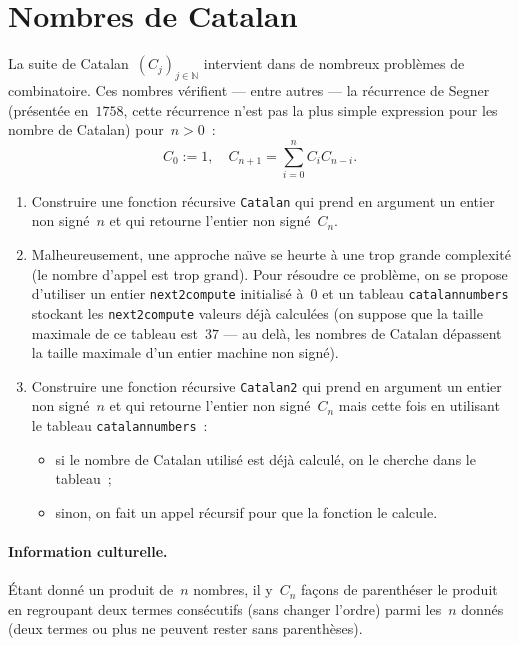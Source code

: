 \section{Nombres de Catalan}
\label{sec:NombresCatalan}
La suite   de Catalan~$(C_{j})_{j\in\mathbb{N}}$ intervient   dans  de
nombreux probl\`emes de combinatoire.  
Ces nombres v\'erifient --- entre autres --- la r\'ecurrence de Segner
(pr\'esent\'ee en~$1758$,    cette  r\'ecurrence  n'est  pas  la  plus
simple expression pour les nombre de Catalan) pour~${n>0}$~:
\[
C_{0}:= 1, \quad C_{n+1}= \sum_{i=0}^{n} C_{i}C_{n-i}.
\]
\begin{enumerate}
\item Construire   une  fonction r\'ecursive \texttt{Catalan} qui prend  en   argument  un entier  non
sign\'e~$n$ et qui retourne l'entier non sign\'e~$C_{n}$.
\ifcorrection
\begin{correction}
  \par

\end{correction}
\fi
\item[] Malheureusement, une approche na\"\i{}ve se heurte \`a une
  trop grande complexit\'e (le nombre d'appel est trop grand). Pour
  r\'esoudre ce probl\`eme, on se propose d'utiliser un entier
  \texttt{next2compute} initialis\'e \`a~$0$ et un tableau \texttt{catalannumbers}
  stockant les \texttt{next2compute} valeurs d\'ej\`a calcul\'ees (on
  suppose que la taille maximale de ce tableau est~$37$ --- au del\`a, les nombres
  de Catalan d\'epassent la taille maximale d'un entier machine non sign\'e).
\item Construire une fonction r\'ecursive \texttt{Catalan2} qui
  prend en argument un entier non sign\'e~$n$ et qui retourne l'entier
  non sign\'e~$C_{n}$ mais cette fois en utilisant le tableau \texttt{catalannumbers}~:
  \begin{itemize}
  \item si le nombre de Catalan utilis\'e est d\'ej\`a calcul\'e, on
    le cherche dans le tableau~;
  \item sinon, on fait un appel r\'ecursif pour que la fonction le calcule.
  \end{itemize}
    \ifcorrection
  \begin{correction}
    \par

  \end{correction}
\fi
\end{enumerate}

\paragraph{Information culturelle.}
\'Etant donn\'e un produit de~$n$ nombres,  il y~$C_{n}$ fa\c{c}ons de
parenth\'eser le produit en regroupant deux termes cons\'ecutifs (sans
changer l'ordre)  parmi   les~$n$ donn\'es (deux  termes    ou plus ne
peuvent rester sans parenth\`eses).
